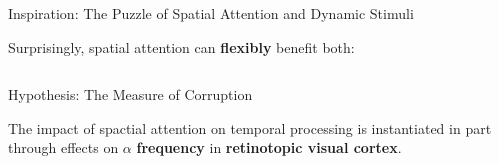 \begin{frame}{Inspiration: The Puzzle of Spatial Attention and Dynamic Stimuli}

    Surprisingly, spatial attention can \textbf{\textcolor{lightlavender}{flexibly}} benefit both:
    
    \begin{columns}[T]

        \begin{column}{0.45\textwidth}
        \end{column}
        
        \begin{column}{0.45\textwidth}
        \end{column}
        
        \end{columns}
    
        \vspace{15pt}
    
\end{frame}


\begin{frame}{{Hypothesis:} The Measure of Corruption}

     The impact of spactial attention on temporal processing is instantiated in part through effects on \textcolor<+->{lightlavender}{$\alpha$ \textbf{frequency}} in \textcolor<+->{lightlavender}{\textbf{retinotopic visual cortex}}.
    
    
        
    \end{frame}

